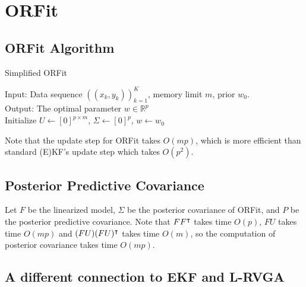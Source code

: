 
\section{ORFit}

\subsection{ORFit Algorithm}

\begin{algorithm}
\dontprintsemicolon
\caption{Simplified ORFit}
\label{algo:orfit}
Input: Data sequence $((x_k, y_k))_{k=1}^{K}$, memory limit $m$, prior $w_0$.\\
Output: The optimal parameter $w \in \mathbb{R}^{p}$ \\
Initialize $U \gets [0]^{p \times m}$, $\Sigma \gets [0]^{p}$, $w \gets w_0$ \\
\end{algorithm}

Note that the update step for ORFit takes $O(mp)$, which is more efficient than standard (E)KF's update step which takes $O(p^2)$.

\subsection{Posterior Predictive Covariance}

Let $F$ be the linearized model, $\Sigma$ be the posterior covariance of ORFit, 
and $P$ be the posterior predictive covariance.
Note that $FF^{\intercal}$ takes time $O(p)$, $FU$ takes time $O(mp)$ and $(FU)(FU)^{\intercal}$ takes time $O(m)$,
so the computation of posterior covariance takes time $O(mp)$.



\subsection{A different connection to EKF and L-RVGA}

